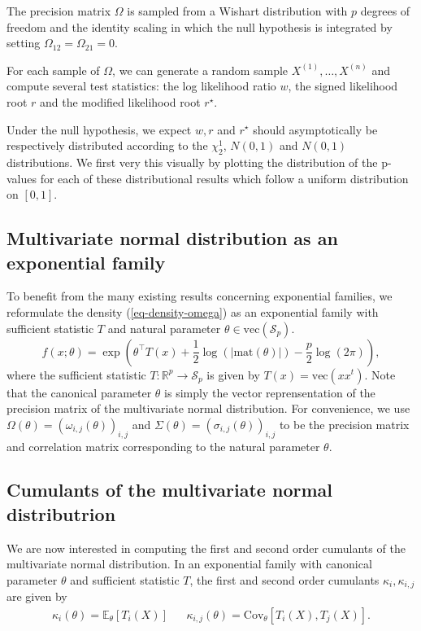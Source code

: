 The precision matrix $\Omega$ is sampled from a Wishart distribution with $p$ degrees of freedom and the identity scaling in which the null hypothesis is integrated by setting $\Omega_{12} = \Omega_{21} = 0$.

For each sample of $\Omega$, we can generate a random sample $X^{(1)}, \ldots, X^{(n)}$ and  compute several test statistics: the log likelihood ratio $w$, the signed likelihood root $r$ and the modified likelihood root $r^\star$. 

Under the null hypothesis, we expect $w, r$ and $r^\star$ should asymptotically be respectively distributed according to the $\chi_2^1$, $N(0,1)$ and $N(0,1)$ distributions. We first very this visually by plotting the distribution of the p-values for each of these distributional results which follow a uniform distribution on $[0, 1]$.

\subsection{Multivariate normal distribution as an exponential family}
To benefit from the many existing results concerning exponential families, we reformulate the density (\ref{eq-density-omega}) as an exponential family with sufficient statistic $T$ and natural parameter $\theta \in \text{vec}(\mathcal{S}_p)$. 
\begin{equation} \label{eq-density-theta}
    f(x; \theta) = \exp\left(\theta^\top T(x) + \frac{1}{2}\log\left(|\text{mat}(\theta)|\right) - \frac{p}{2}\log\left(2\pi\right)\right),
\end{equation}
where the sufficient statistic $T : \mathbb{R}^p \rightarrow \mathcal{S}_p$ is given by $T(x) = \text{vec}(xx^t)$. Note that the canonical parameter $\theta$ is simply the vector reprensentation of the precision matrix of the multivariate normal distribution. For convenience, we use $\Omega(\theta) = (\omega_{i,j}(\theta))_{i,j}$ and $\Sigma(\theta) = (\sigma_{i,j}(\theta))_{i,j}$ to be the precision matrix and correlation matrix corresponding to the natural parameter $\theta$.

\subsection{Cumulants of the multivariate normal distributrion}

We are now interested in computing the first and second order cumulants of the multivariate normal distribution. In an exponential family with canonical parameter $\theta$ and sufficient statistic $T$, the first and second order cumulants $\kappa_i, \kappa_{i, j}$ are given by
\begin{align*}
    \kappa_i(\theta) = \mathbb{E}_\theta\left[T_i(X)\right] && \kappa_{i,j}(\theta) = \text{Cov}_\theta\left[T_i(X), T_j(X)\right].
\end{align*}

